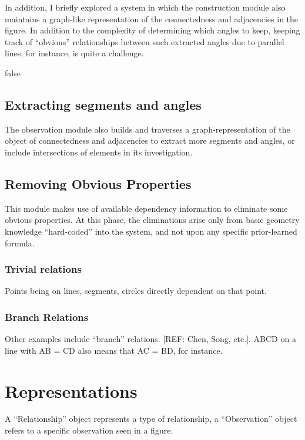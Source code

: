 In addition, I briefly explored a system in which the construction
module also maintains a graph-like representation of the connectedness
and adjacencies in the figure. In addition to the complexity of
determining which angles to keep, keeping track of ``obvious''
relationships between such extracted angles due to parallel lines, for
instance, is quite a challenge.


\if false

\subsection{Extracting segments and angles}

The observation module also builds and traverses a
graph-representation of the object of connectedness and adjacencies to
extract more segments and angles, or include intersections of elements
in its investigation.

\subsection{Removing Obvious Properties}

This module makes use of available dependency information to eliminate
some obvious properties. At this phase, the eliminations arise only
from basic geometry knowledge ``hard-coded'' into the system, and not
upon any specific prior-learned formula.

\subsubsection{Trivial relations}

Points being on lines, segments, circles directly dependent on that point.

\subsubsection{Branch Relations}

Other examples include ``branch'' relations. [REF: Chen, Song,
  etc.]. ABCD on a line with AB = CD also means that AC = BD, for instance.

\section{Representations}

A ``Relationship'' object represents a type of relationship, a
``Observation'' object refers to a specific observation seen in a
figure.

\fi
